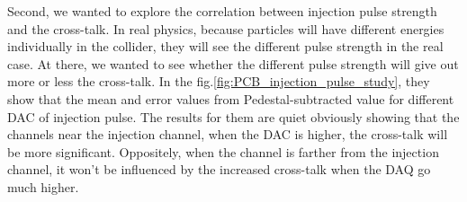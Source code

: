 Second, we wanted to explore the correlation between injection pulse strength and the cross-talk. In real physics, because particles will have different energies individually in the collider, they will see the different pulse strength in the real case. At there, we wanted to see whether the different pulse strength will give out more or less the cross-talk. In the fig.\ref{fig:PCB_injection_pulse_study}, they show that the mean and error values from Pedestal-subtracted value for different DAC of injection pulse. The results for them are quiet obviously showing that the channels near the injection channel, when the DAC is higher, the cross-talk will be more significant. Oppositely, when the channel is farther from the injection channel, it won't be influenced by the increased cross-talk when the DAQ go much higher.

